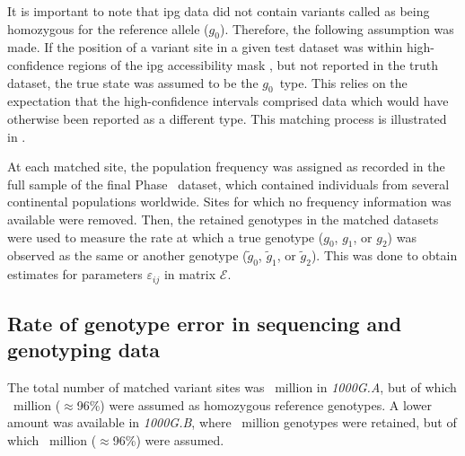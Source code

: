 It is important to note that \gls{ipg} data did not contain variants called as being homozygous for the reference allele ($g_0$).
Therefore, the following assumption was made.
If the position of a variant site in a given test dataset was within high-confidence regions of the \gls{ipg} accessibility mask , but not reported in the truth dataset, the true state was assumed to be the $g_0$~type.
This relies on the expectation that the high-confidence intervals comprised data which would have otherwise been reported as a different type.
This matching process is illustrated in .

At each matched site, the population frequency was assigned as recorded in the full sample of the final  Phase~ dataset, which contained  individuals from several continental populations worldwide.
Sites for which no frequency information was available were removed.
Then, the retained genotypes in the matched datasets were used to measure the rate at which a true genotype ($g_0$, $g_1$, or $g_2$) was observed as the same or another genotype ($\tilde{g}_0$, $\tilde{g}_1$, or $\tilde{g}_2$).
This was done to obtain estimates for  parameters $\varepsilon_{ij}$ in matrix $\mathcal{E}$.






%
\subsection{Rate of genotype error in sequencing and genotyping data}
%


The total number of matched variant sites was ~million in \emph{1000G.A}, but of which ~million ($\approx$96\%) were assumed as homozygous reference genotypes.
A lower amount was available in \emph{1000G.B}, where ~million genotypes were retained, but of which ~million ($\approx$96\%) were assumed.

